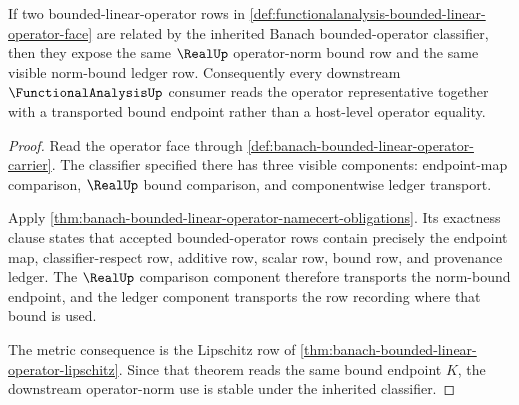 \begin{theorem}
\label{thm:functionalanalysis-operator-norm-stability-obligation}
If two bounded-linear-operator rows in
\autoref{def:functionalanalysis-bounded-linear-operator-face} are related by
the inherited Banach bounded-operator classifier, then they expose the same
$\RealUp$ operator-norm bound row and the same visible norm-bound ledger row.
Consequently every downstream $\FunctionalAnalysisUp$ consumer reads the
operator representative together with a transported bound endpoint rather
than a host-level operator equality.
\end{theorem}
\begin{proof}
Read the operator face through
\autoref{def:banach-bounded-linear-operator-carrier}. The classifier specified
there has three visible components: endpoint-map comparison, $\RealUp$ bound
comparison, and componentwise ledger transport.

Apply \autoref{thm:banach-bounded-linear-operator-namecert-obligations}. Its
exactness clause states that accepted bounded-operator rows contain precisely
the endpoint map, classifier-respect row, additive row, scalar row, bound row,
and provenance ledger. The $\RealUp$ comparison component therefore transports
the norm-bound endpoint, and the ledger component transports the row recording
where that bound is used.

The metric consequence is the Lipschitz row of
\autoref{thm:banach-bounded-linear-operator-lipschitz}. Since that theorem
reads the same bound endpoint $K$, the downstream operator-norm use is stable
under the inherited classifier.
\end{proof}

